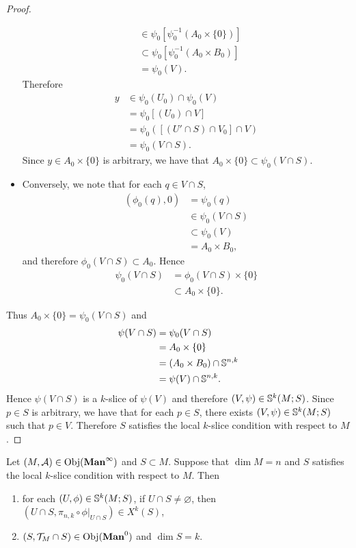 \documentclass{book}
\begin{document}
\begin{proof}
\begin{itemize}
\begin{align*}
				& \in \psi_0[\psi_0^{-1}(A_0 \times \{0\})] \\
				& \subset \psi_0[\psi_0^{-1}(A_0 \times B_0)] \\
				& = \psi_0(V) .
			\end{align*}
			Therefore 
			\begin{align*}
				y
				& \in \psi_0(U_0) \cap \psi_0(V)  \\
				& = \psi_0[(U_0) \cap V] \\
				& = \psi_0([(U' \cap S) \cap V_0] \cap V) \\
				& = \psi_0(V \cap S).
			\end{align*}
			Since $y \in A_0 \times \{0\}$ is arbitrary, we have that $A_0 \times \{0\} \subset \psi_0(V \cap S)$.  
			\item Conversely, we note that for each $q \in V \cap S$, 
			\begin{align*}
				(\phi_0(q), 0)
				& =  \psi_0(q) \\
				& \in \psi_0(V \cap S) \\
				& \subset \psi_0(V) \\
				& = A_0 \times B_0, 
			\end{align*}
			and therefore $\phi_0(V \cap S) \subset A_0$. Hence 
			\begin{align*}
				\psi_0(V \cap S)
				& = \phi_0(V \cap S) \times \{0\} \\
				& \subset A_0 \times \{0\}.
			\end{align*}
		\end{itemize}
		Thus $A_0 \times \{0\} = \psi_0(V \cap S)$ and 
		\begin{align*}
			\psi(V \cap S)
			& = \psi_0(V \cap S) \\
			& = A_0 \times \{0\} \\
			& = (A_0 \times B_0) \cap \S^{n,k} \\
			& = \psi(V) \cap \S^{n,k}.
		\end{align*}
		Hence $\psi(V \cap S)$ is a $k$-slice of $\psi(V)$ and therefore $(V, \psi) \in \S^k(M; S)$. Since $p \in S$ is arbitrary, we have that for each $p \in S$, there exists $(V, \psi) \in \S^k(M; S)$ such that $p \in V$. Therefore $S$ satisfies the local $k$-slice condition with respect to $M$. 
	\end{proof}

	\begin{ex} 
		Let $(M, \MA) \in \Obj(\Maninf)$ and $S \subset M$. Suppose that $\dim M = n$ and $S$ satisfies the local $k$-slice condition with respect to $M$. Then 
		\begin{enumerate}
			\item for each $(U, \phi) \in \S^k(M; S)$, if $U \cap S \neq \varnothing$, then $(U \cap S, \pi_{n, k} \circ \phi|_{U \cap S}) \in X^k(S)$, 
			\item $(S, \MT_M \cap S) \in \Obj(\Man0)$ and $\dim S = k$.
		\end{enumerate}
	\end{ex}
\end{document}
